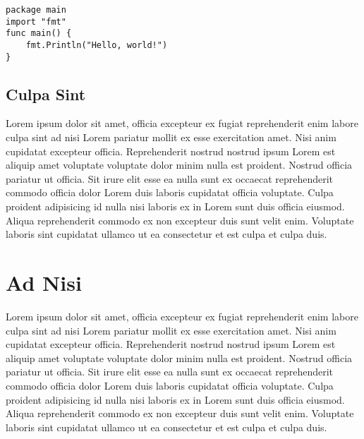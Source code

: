 \begingroup
\fontsize{10pt}{12pt}\selectfont
\begin{verbatim}
package main
import "fmt"
func main() {
    fmt.Println("Hello, world!")
}
\end{verbatim}
\endgroup

\subsection{Culpa Sint}
Lorem ipsum dolor sit amet, officia excepteur ex fugiat reprehenderit enim labore culpa sint ad nisi Lorem pariatur mollit ex esse exercitation amet. Nisi anim cupidatat excepteur officia. Reprehenderit nostrud nostrud ipsum Lorem est aliquip amet voluptate voluptate dolor minim nulla est proident. Nostrud officia pariatur ut officia. Sit irure elit esse ea nulla sunt ex occaecat reprehenderit commodo officia dolor Lorem duis laboris cupidatat officia voluptate. Culpa proident adipisicing id nulla nisi laboris ex in Lorem sunt duis officia eiusmod. Aliqua reprehenderit commodo ex non excepteur duis sunt velit enim. Voluptate laboris sint cupidatat ullamco ut ea consectetur et est culpa et culpa duis.

\section{Ad Nisi}
Lorem ipsum dolor sit amet, officia excepteur ex fugiat reprehenderit enim labore culpa sint ad nisi Lorem pariatur mollit ex esse exercitation amet. Nisi anim cupidatat excepteur officia. Reprehenderit nostrud nostrud ipsum Lorem est aliquip amet voluptate voluptate dolor minim nulla est proident. Nostrud officia pariatur ut officia. Sit irure elit esse ea nulla sunt ex occaecat reprehenderit commodo officia dolor Lorem duis laboris cupidatat officia voluptate. Culpa proident adipisicing id nulla nisi laboris ex in Lorem sunt duis officia eiusmod. Aliqua reprehenderit commodo ex non excepteur duis sunt velit enim. Voluptate laboris sint cupidatat ullamco ut ea consectetur et est culpa et culpa duis.

